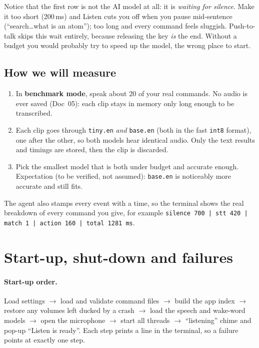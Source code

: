 \documentclass[11pt,a4paper]{article}
\begin{document}
\begin{why}
Notice that the first row is not the AI model at all: it is \emph{waiting for silence}. Make
it too short (200\,ms) and Listen cuts you off when you pause mid-sentence (``search\ldots what
is an atom''); too long and every command feels sluggish. Push-to-talk skips this wait
entirely, because releasing the key \emph{is} the end. Without a budget you would probably try
to speed up the model, the wrong place to start.
\end{why}

\subsection{How we will measure}
\begin{enumerate}[nosep]
  \item In \textbf{benchmark mode}, speak about 20 of your real commands. No audio is ever saved
        (Doc~05): each clip stays in memory only long enough to be transcribed.
  \item Each clip goes through \texttt{tiny.en} \emph{and} \texttt{base.en} (both in the fast
        \texttt{int8} format), one after the other, so both models hear identical audio. Only
        the text results and timings are stored, then the clip is discarded.
  \item Pick the smallest model that is both under budget and accurate enough. Expectation
        (to be verified, not assumed): \texttt{base.en} is noticeably more accurate and still
        fits.
\end{enumerate}
\noindent The agent also stamps every event with a time, so the terminal shows the real
breakdown of every command you give, for example
\texttt{silence 700 | stt 420 | match 1 | action 160 | total 1281 ms}.

\section{Start-up, shut-down and failures}

\paragraph{Start-up order.} Load settings $\to$ load and validate command files $\to$ build
the app index $\to$ restore any volumes left ducked by a crash $\to$ load the speech and
wake-word models $\to$ open the microphone $\to$ start all threads $\to$ ``listening'' chime
and pop-up ``Listen is ready''. Each step prints a line in the terminal, so a failure points
at exactly one step.
\end{document}
